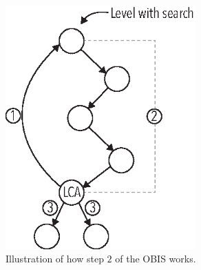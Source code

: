 \begin{figure}[h]
    \centering
    \includegraphics[width=0.65\textwidth]{pictures/ors_step2.eps}
    \caption{Illustration of how step $2$ of the OBIS works.}
    \label{fig:orstep2}
\end{figure}






